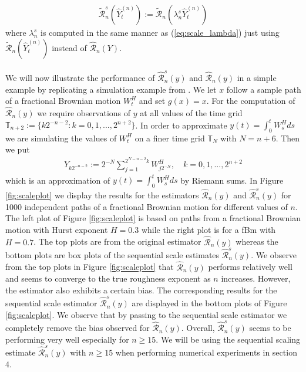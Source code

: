 \documentclass{article}
\begin{document}
\begin{align*}
\widetilde{\mathscr{R}}_n^s (\widehat{Y}_t^{(n)}) := \widetilde{\mathscr{R}}_n (\lambda_n^s \widehat{Y}_t^{(n)})
\end{align*} 
where $\lambda_n^s$ is computed in the same manner as (\ref{eq:scale_lambda}) just using $\widetilde{\mathscr{R}}_n(\widehat{Y}_t^{(n)})$ instead of $\widehat{\mathscr{R}}_n(Y)$.\\\\
We will now illustrate the performance of $\hat{\mathscr{R}}_n^s (y)$ and $\hat{\mathscr{R}}_n (y)$ in a simple example by replicating a simulation example from \cite{han}. We let $x$ follow a sample path of a fractional Brownian motion $W^H_t$ and set $g(x)=x$. For the computation of $\hat{\mathscr{R}}_n (y)$ we require observations of $y$ at all values of the time grid $\mathbb{T}_{n+2}:= \{k 2^{-n-2} : k=0,1,...,2^{n+2}\}$. In order to approximate $y(t)=\int_0^t W^H_s ds$ we are simulating the values of $W^H_t$ on a finer time grid $\mathbb{T}_N$ with $N=n+6$. Then we put
\begin{align}
Y_{k2^{-n-2}}:= 2^{-N} \sum_{j=1}^{2^{N-n-2}k} W^H_{j2^{-N}}, \quad k=0,1,...,2^{n+2} \label{eq:scaley}
\end{align}
which is an approximation of $y(t)=\int_0^t W^H_s ds$ by Riemann sums. In Figure \ref{fig:scaleplot} we display the results for the estimators $\hat{\mathscr{R}}_n (y)$ and $\hat{\mathscr{R}}_n^s (y)$ for 1000 independent paths of a fractional Brownian motion for different values of $n$. The left plot of Figure \ref{fig:scaleplot} is based on paths from a fractional Brownian motion with Hurst exponent $H=0.3$ while the right plot is for a fBm with $H=0.7$. The top plots are from the original estimator $\hat{\mathscr{R}}_n (y)$ whereas the bottom plots are box plots of the sequential scale estimates $\hat{\mathscr{R}}_n^s (y)$. We observe from the top plots in Figure \ref{fig:scaleplot} that $\hat{\mathscr{R}}_n (y)$ performs relatively well and seems to converge to the true roughness exponent as $n$ increases. However, the estimator also exhibits a certain bias. The corresponding results for the sequential scale estimator $\hat{\mathscr{R}}_n^s (y)$ are displayed in the bottom plots of Figure \ref{fig:scaleplot}. We observe that by passing to the sequential scale estimator we completely remove the bias observed for $\hat{\mathscr{R}}_n (y)$. Overall, $\hat{\mathscr{R}}_n^s (y)$ seems to be performing very well especially for $n\geq 15$. We will be using the sequential scaling estimate $\hat{\mathscr{R}}_n^s (y)$ with $n\geq 15$ when performing numerical experiments in section 4.
\end{document}
